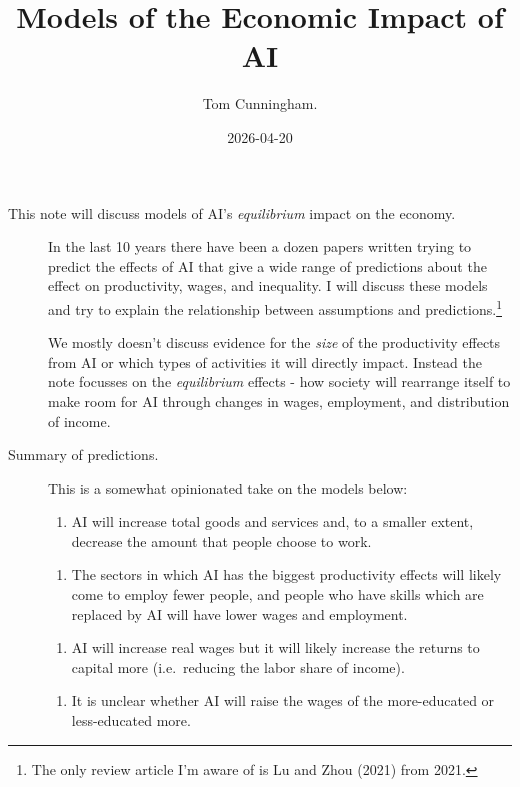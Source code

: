 \documentclass[
  11pt,
  letterpaper,
  DIV=11,
  numbers=noendperiod,
  oneside]{scrartcl}
\title{Models of the Economic Impact of AI}
\author{Tom Cunningham.}
\date{2026-04-20}
\providecommand{\tightlist}{%
  \setlength{\itemsep}{0pt}\setlength{\parskip}{0pt}}\usepackage{longtable,booktabs,array}
\begin{document}
\maketitle


\begin{description}
\item[This note will discuss models of AI's \emph{equilibrium} impact on
the economy.]
In the last 10 years there have been a dozen papers written trying to
predict the effects of AI that give a wide range of predictions about
the effect on productivity, wages, and inequality. I will discuss these
models and try to explain the relationship between assumptions and
predictions.\footnote{The only review article I'm aware of is Lu and
  Zhou (2021) from 2021.}

We mostly doesn't discuss evidence for the \emph{size} of the
productivity effects from AI or which types of activities it will
directly impact. Instead the note focusses on the \emph{equilibrium}
effects - how society will rearrange itself to make room for AI through
changes in wages, employment, and distribution of income.
\item[Summary of predictions.]
This is a somewhat opinionated take on the models below:

\begin{enumerate}
\def\labelenumi{\arabic{enumi}.}
\tightlist
\item
  AI will increase total goods and services and, to a smaller extent,
  decrease the amount that people choose to work.
\end{enumerate}

\begin{enumerate}
\def\labelenumi{\arabic{enumi}.}
\setcounter{enumi}{1}
\tightlist
\item
  The sectors in which AI has the biggest productivity effects will
  likely come to employ fewer people, and people who have skills which
  are replaced by AI will have lower wages and employment.
\end{enumerate}

\begin{enumerate}
\def\labelenumi{\arabic{enumi}.}
\setcounter{enumi}{2}
\tightlist
\item
  AI will increase real wages but it will likely increase the returns to
  capital more (i.e.~reducing the labor share of income).
\end{enumerate}

\begin{enumerate}
\def\labelenumi{\arabic{enumi}.}
\setcounter{enumi}{3}
\tightlist
\item
  It is unclear whether AI will raise the wages of the more-educated or
  less-educated more.
\end{enumerate}


\end{description}
\end{document}
